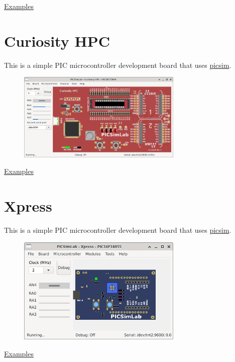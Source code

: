 \href{https://lcgamboa.github.io/picsimlab_examples/board_Curiosity.html}{Examples}

\section{Curiosity HPC}

This is a simple PIC microcontroller development board that uses \href{https://github.com/lcgamboa/picsim}{picsim}.

\begin{figure}[H]
\center
\includegraphics[width=0.7\textwidth]{img/Curiosity_HPC.png} 
\end{figure} 

\href{https://lcgamboa.github.io/picsimlab_examples/board_Curiosity_HPC.html}{Examples}

\section{Xpress}

This is a simple PIC microcontroller development board that uses \href{https://github.com/lcgamboa/picsim}{picsim}.

\begin{figure}[H]
\center
\includegraphics[width=0.7\textwidth]{img/Xpress.png} 
\end{figure} 

\href{https://lcgamboa.github.io/picsimlab_examples/board_Xpress.html}{Examples}

